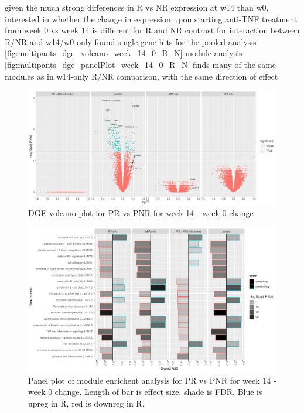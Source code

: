 \begin{outline}
\1 given the much strong differences in R vs NR expression at w14 than w0, interested in whether the change in expression upon starting anti-TNF treatment from week 0 vs week 14 is different for R and NR
    \2 contrast for interaction between R/NR and w14/w0
    \2 only found single gene hits for the pooled analysis \autoref{fig:multipants_dge_volcano_week_14_0_R_N}
    \2 module analysis \autoref{fig:multipants_dge_panelPlot_week_14_0_R_N}
        \3 finds many of the same modules as in w14-only R/NR comparison, with the same direction of effect

\begin{figure}
    \centering
    \includegraphics[width=1.0\textwidth,page=1]{mainmatter/figures/chapter_04/plot_gene_set_enrichment.dge_result_volcano_C_(3RI_1RI)_(3NI_1NI),C_(3RA_1RA)_(3NA_1NA),C_((3RI_1RI)_(3NI_1NI))_((3RA_1RA)_(3NA_1NA)),C_(3R_1R)_(3N_1N).pdf}
    \caption{DGE volcano plot for PR vs PNR for week 14 - week 0 change}
    \label{fig:multipants_dge_volcano_week_14_0_R_N}
\end{figure}

\begin{figure}
    \centering
    \includegraphics[width=1.0\textwidth,page=1]{mainmatter/figures/chapter_04/plot_gene_set_enrichment.tmodCERNO_panelplot_C_(3RI_1RI)_(3NI_1NI),C_(3RA_1RA)_(3NA_1NA),C_((3RI_1RI)_(3NI_1NI))_((3RA_1RA)_(3NA_1NA)),C_(3R_1R)_(3N_1N).pdf}
    \caption{Panel plot of module enrichent analysis for PR vs PNR for week 14 - week 0 change. Length of bar is effect size, shade is FDR. Blue is upreg in R, red is downreg in R.}
    \label{fig:multipants_dge_panelPlot_week_14_0_R_N}
\end{figure}


\end{outline}
